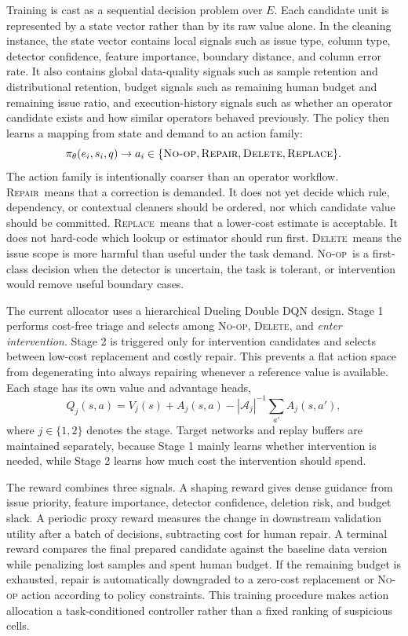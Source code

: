 \documentclass[sigconf, nonacm]{acmart}
\newcommand{\noop}{\textsc{No-op}\xspace}
\newcommand{\repair}{\textsc{Repair}\xspace}
\newcommand{\deleteop}{\textsc{Delete}\xspace}
\newcommand{\replaceop}{\textsc{Replace}\xspace}
\begin{document}
Training is cast as a sequential decision problem over $E$. Each candidate unit is represented by a state vector rather than by its raw value alone. In the cleaning instance, the state vector contains local signals such as issue type, column type, detector confidence, feature importance, boundary distance, and column error rate. It also contains global data-quality signals such as sample retention and distributional retention, budget signals such as remaining human budget and remaining issue ratio, and execution-history signals such as whether an operator candidate exists and how similar operators behaved previously. The policy then learns a mapping from state and demand to an action family:
\[
  \pi_\theta(e_i,s_i,q)\rightarrow
  a_i\in\{\noop,\repair,\deleteop,\replaceop\}.
\]
The action family is intentionally coarser than an operator workflow. \repair\ means that a correction is demanded. It does not yet decide which rule, dependency, or contextual cleaners should be ordered, nor which candidate value should be committed. \replaceop\ means that a lower-cost estimate is acceptable. It does not hard-code which lookup or estimator should run first. \deleteop\ means the issue scope is more harmful than useful under the task demand. \noop\ is a first-class decision when the detector is uncertain, the task is tolerant, or intervention would remove useful boundary cases.

The current allocator uses a hierarchical Dueling Double DQN design. Stage 1 performs cost-free triage and selects among \noop, \deleteop, and \emph{enter intervention}. Stage 2 is triggered only for intervention candidates and selects between low-cost replacement and costly repair. This prevents a flat action space from degenerating into always repairing whenever a reference value is available. Each stage has its own value and advantage heads,
\[
Q_j(s,a)=V_j(s)+A_j(s,a)-|\mathcal{A}_j|^{-1}\textstyle\sum_{a'} A_j(s,a'),
\]
where $j\in\{1,2\}$ denotes the stage. Target networks and replay buffers are maintained separately, because Stage 1 mainly learns whether intervention is needed, while Stage 2 learns how much cost the intervention should spend.

The reward combines three signals. A shaping reward gives dense guidance from issue priority, feature importance, detector confidence, deletion risk, and budget slack. A periodic proxy reward measures the change in downstream validation utility after a batch of decisions, subtracting cost for human repair. A terminal reward compares the final prepared candidate against the baseline data version while penalizing lost samples and spent human budget. If the remaining budget is exhausted, repair is automatically downgraded to a zero-cost replacement or \noop action according to policy constraints. This training procedure makes action allocation a task-conditioned controller rather than a fixed ranking of suspicious cells.
\end{document}
